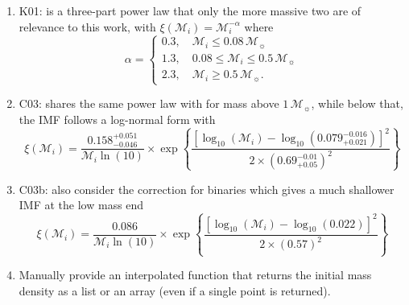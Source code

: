 \documentclass[fleqn,usenatbib]{rasti}
\newcommand{\msun}{\mathcal{M}_{\sun}}
\begin{document}
\begin{enumerate}
    \item K01: \citet{2001MNRAS.322..231K} is a three-part power law that only the
    more massive two are of relevance to this work, with
    $\xi(\mathcal{M}_i) = \mathcal{M}_i^{-\alpha}$ where
    \begin{equation}
        \alpha =
        \begin{cases}
            0.3, \quad \mathcal{M}_i \leq 0.08\,\msun\\
            1.3, \quad 0.08 \leq \mathcal{M}_i \leq 0.5\,\msun\\
            2.3, \quad \mathcal{M}_i \geq 0.5\,\msun.
        \end{cases}
    \end{equation}
    \item C03: \citet{2003PASP..115..763C} shares the same power law with
    \citet{2001MNRAS.322..231K} for mass above $1\,\msun$, while below that,
    the IMF follows a log-normal form with
    \begin{equation}
        \xi(\mathcal{M}_i) = \dfrac{0.158^{+0.051}_{-0.046}}{\mathcal{M}_i \ln(10)} \times
            \exp{\left\{\dfrac{\left[\log_{10}(\mathcal{M}_i) - \log_{10}\left(0.079^{-0.016}_{+0.021}\right)\right]^2}{2 \times (0.69^{-0.01}_{+0.05})^2}\right\}}
    \end{equation}
    \item C03b: \citet[][including binary]{2003PASP..115..763C} also consider the correction for binaries which gives a much shallower IMF at the low mass end
    \begin{equation}
        \xi(\mathcal{M}_i) = \dfrac{0.086}{\mathcal{M}_i \ln(10)} \times
            \exp{\left\{\dfrac{\left[\log_{10}(\mathcal{M}_i) - \log_{10}\left(0.022\right)\right]^2}{2 \times (0.57)^2}\right\}}
    \end{equation}
    \item Manually provide an interpolated function that returns the initial mass density as a list or an array (even if a single point is returned).
\end{enumerate}
\end{document}

